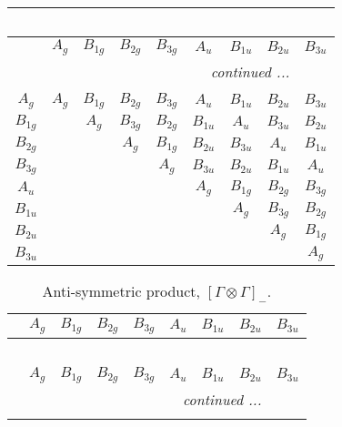 \documentclass[fleqn,10pt,landscape]{article}
\begin{document}
\begin{itemize}
\begin{center}
\begin{longtable}{c|cccccccc}
\multicolumn{8}{l}{\tablename\ \thetable{}} \\
 \hline \hline
 & $ A_{g} $ & $ B_{1g} $ & $ B_{2g} $ & $ B_{3g} $ & $ A_{u} $ & $ B_{1u} $ & $ B_{2u} $ & $ B_{3u} $ \\ \hline \endhead

 \hline \hline
\multicolumn{8}{r}{\footnotesize\it continued ...} \\ \endfoot

 \hline \hline
\multicolumn{8}{r}{} \\ \endlastfoot

$ A_{g} $ & $ A_{g} $ & $ B_{1g} $ & $ B_{2g} $ & $ B_{3g} $ & $ A_{u} $ & $ B_{1u} $ & $ B_{2u} $ & $ B_{3u} $ \\
$ B_{1g} $ & $  $ & $ A_{g} $ & $ B_{3g} $ & $ B_{2g} $ & $ B_{1u} $ & $ A_{u} $ & $ B_{3u} $ & $ B_{2u} $ \\
$ B_{2g} $ & $  $ & $  $ & $ A_{g} $ & $ B_{1g} $ & $ B_{2u} $ & $ B_{3u} $ & $ A_{u} $ & $ B_{1u} $ \\
$ B_{3g} $ & $  $ & $  $ & $  $ & $ A_{g} $ & $ B_{3u} $ & $ B_{2u} $ & $ B_{1u} $ & $ A_{u} $ \\
$ A_{u} $ & $  $ & $  $ & $  $ & $  $ & $ A_{g} $ & $ B_{1g} $ & $ B_{2g} $ & $ B_{3g} $ \\
$ B_{1u} $ & $  $ & $  $ & $  $ & $  $ & $  $ & $ A_{g} $ & $ B_{3g} $ & $ B_{2g} $ \\
$ B_{2u} $ & $  $ & $  $ & $  $ & $  $ & $  $ & $  $ & $ A_{g} $ & $ B_{1g} $ \\
$ B_{3u} $ & $  $ & $  $ & $  $ & $  $ & $  $ & $  $ & $  $ & $ A_{g} $ \\
\end{longtable}
\end{center}
\begin{center}
\renewcommand{\arraystretch}{1.0}
\begin{longtable}{ccccccccc}
\caption{Anti-symmetric product, $[\Gamma\otimes\Gamma]_-$.}
 \\
 \hline \hline
 & $ A_{g} $ & $ B_{1g} $ & $ B_{2g} $ & $ B_{3g} $ & $ A_{u} $ & $ B_{1u} $ & $ B_{2u} $ & $ B_{3u} $ \\ \hline \endfirsthead

\multicolumn{8}{l}{\tablename\ \thetable{}} \\
 \hline \hline
 & $ A_{g} $ & $ B_{1g} $ & $ B_{2g} $ & $ B_{3g} $ & $ A_{u} $ & $ B_{1u} $ & $ B_{2u} $ & $ B_{3u} $ \\ \hline \endhead

 \hline \hline
\multicolumn{8}{r}{\footnotesize\it continued ...} \\ \endfoot


\end{longtable}
\end{center}
\end{itemize}
\end{document}
